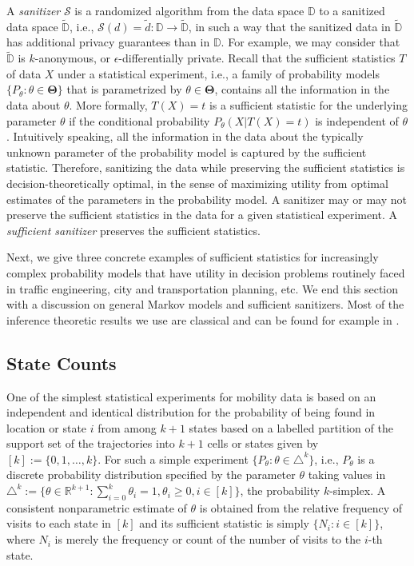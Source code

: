 \documentclass[times,twocolumn,final,authoryear]{elsarticle}
\begin{document}
A {\em sanitizer} $\mathcal{S}$ is a randomized algorithm from the data space $\mathbb{D}$ to a sanitized data space $\widetilde{\mathbb{D}}$, i.e., $\mathcal{S}(d)=\widetilde{d} : \mathbb{D} \to \widetilde{\mathbb{D}}$, in such a way that the sanitized data in $\widetilde{\mathbb{D}}$ has additional privacy guarantees than in $\mathbb{D}$.
For example, we may consider that  $\widetilde{\mathbb{D}}$ is $k$-anonymous, or $\epsilon$-differentially private.
Recall that the sufficient statistics $T$ of data $X$ under a statistical experiment, i.e., a family of probability models $\{P_{\theta}: \theta \in \mathbf{\Theta}\}$ that is parametrized by $\theta \in \mathbf{\Theta}$, contains all the information in the data about $\theta$.  
More formally, $T(X)=t$ is a sufficient statistic for the underlying parameter $\theta$ if the conditional probability $P_{\theta}(X | T(X)=t)$ is independent of $\theta$.  
Intuitively speaking, all the information in the data about the typically unknown parameter of the probability model is captured by the sufficient statistic.  
Therefore, sanitizing the data while preserving the sufficient statistics is decision-theoretically optimal, in the sense of maximizing utility from optimal estimates of the parameters in the probability model. 
A sanitizer may or may not preserve the sufficient statistics in the data for a given statistical experiment.
A {\em sufficient sanitizer} preserves the sufficient statistics. 

Next, we give three concrete examples of sufficient statistics for increasingly complex probability models that have utility in decision problems routinely faced in traffic engineering, city and transportation planning, etc.  
We end this section with a discussion on general Markov models and sufficient sanitizers.  Most of the inference theoretic results we use are classical and can be found for example in \cite{Billingsley:1961}.

\subsection{State Counts}
One of the simplest statistical experiments for mobility data is based on an independent and identical distribution for the probability of being found in location or state $i$ from among $k+1$ states based on a labelled partition of the support set of the trajectories into $k+1$ cells or states given by $[k] := \{0,1,\ldots,k\}$.  
For such a simple experiment $\{P_{\theta}: \theta \in \triangle^k \}$, i.e., $P_{\theta}$ is a discrete probability distribution specified by the 
parameter $\theta$ taking values in 
$\triangle^k := \{ \theta \in \mathbb{R}^{k+1} : \sum_{i=0}^k \theta_i = 1, \theta_i \geq 0, i \in [k] \}$, 
the probability $k$-simplex. 
A consistent nonparametric estimate of $\theta$ is obtained from the relative frequency of visits to each state in $[k]$ and its sufficient statistic is simply $\{N_i: i \in [k]\}$, where $N_i$ is merely the frequency or count of the number of visits to the $i$-th state.  
\end{document}
